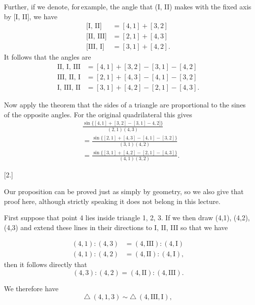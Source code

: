 
Further, if we denote, for\,example, the angle that (I, II) makes with the fixed axis by [I, II],
we have
\[
\begin{array}{rl}
\text{[I, II]} & = [4,1] + [3,2] \\
\text{[II, III]} & = [2,1] + [4,3] \\
\text{[III, I]} & = [3,1] + [4,2].
\end{array}
\]
It follows that the angles are
\[
\begin{array}{rl}
\text{II, I, III} & = [4,1] + [3,2] - [3,1] - [4,2] \\
\text{III, II, I} & = [2,1] + [4,3] - [4,1] - [3,2] \\
\text{I, III, II} & = [3,1] + [4,2] - [2,1] - [4,3].
\end{array}
\]

Now apply the theorem that the sides of a triangle are proportional to the sines of the
opposite angles. For the original quadrilateral this gives
\[
\begin{aligned}
&\frac{\sin\{[4,1]+[3,2]-[3,1]-4,2]\}}{(2,1)(4,3)}\\
&=\frac{\sin\{[2,1]+[4,3]-[4,1]-[3,2]\}}{(3,1)(4,2)}\\
&=\frac{\sin\{[3,1]+[4,2]-[2,1]-[4,3]\}}{(4,1)(3,2)}.
\end{aligned}
\]

\begin{center}
[2.]
\end{center}

Our proposition can be proved just as simply by geometry, so we also give that
proof here, although strictly speaking it does not belong in this lecture.

First suppose that point 4 lies inside triangle 1, 2, 3. If we then draw
(4,1), (4,2), (4,3) and extend these lines in their directions to I, II, III so that
we have

\begin{center}\end{center}

\[
\begin{array}{rl}
(4,1) : (4,3) & = (4,\text{III}) : (4,\text{I}) \\
(4,1) : (4,2) & = (4,\text{II}) : (4,\text{I}),
\end{array}
\]
then it follows directly that
\[
(4,3) : (4,2) = (4,\text{II}) : (4,\text{III}).
\]

We therefore have
\[
\triangle\ (4,1,3) \sim \triangle\ (4,\text{III},\text{I}),
\]
